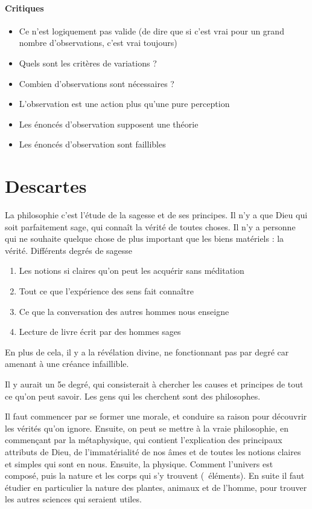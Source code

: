 \documentclass[fleqn,letterpaper, 12pt]{article}
\begin{document}
	
	\paragraph{Critiques}
	\begin{itemize}
		\item Ce n'est logiquement pas valide (de dire que si c'est vrai pour un grand nombre d'observations, c'est vrai toujours)
		\item Quels sont les critères de variations ?
		\item Combien d'observations sont nécessaires ?
		\item L'observation est une action plus qu'une pure perception
		\item Les énoncés d'observation supposent une théorie
		\item Les énoncés d'observation sont faillibles
	\end{itemize}
	
	
	\section{Descartes}
	
	La philosophie c'est l'étude de la sagesse et de ses principes. Il n'y a que Dieu qui soit parfaitement sage, qui connaît la vérité de toutes choses. Il n'y a personne qui ne souhaite quelque chose de plus important que les biens matériels : la vérité.
	Différents degrés de sagesse
	\begin{enumerate}
		\item Les notions si claires qu'on peut les acquérir sans méditation
		\item Tout ce que l'expérience des sens fait connaître
		\item Ce que la conversation des autres hommes nous enseigne
		\item Lecture de livre écrit par des hommes sages
	\end{enumerate}
	En plus de cela, il y a la révélation divine, ne fonctionnant pas par degré car amenant à une créance infaillible.
	
	Il y aurait un 5e degré, qui consisterait à chercher les causes et principes de tout ce qu'on peut savoir. Les gens qui les cherchent sont des philosophes.
	
	Il faut commencer par se former une morale, et conduire sa raison pour découvrir les vérités qu'on ignore. Ensuite, on peut se mettre à la vraie philosophie, en commençant par la métaphysique, qui contient l'explication des principaux attributs de Dieu, de l'immatérialité de nos âmes et de toutes les notions claires et simples qui sont en nous. Ensuite, la physique. Comment l'univers est composé, puis la nature et les corps qui s'y trouvent (~éléments). En suite il faut étudier en particulier la nature des plantes, animaux et de l'homme, pour trouver les autres sciences qui seraient utiles.
	
\end{document}

